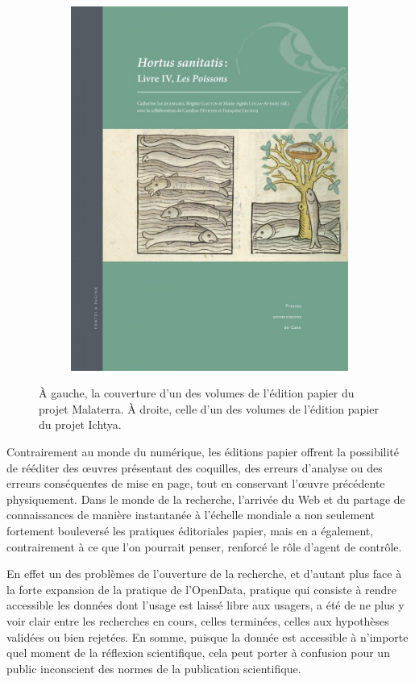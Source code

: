 \documentclass[a4paper,12pt,twoside]{book}
\begin{document}
\begin{figure}[H]
\begin{subfigure}[b]{0.3\linewidth}
      \includegraphics[width=\linewidth]{img/autre/depiscibus.jpg}
    \end{subfigure}
    \caption{À gauche, la couverture d'un des volumes de l'édition papier du projet Malaterra. À droite, celle d'un des volumes de l'édition papier du projet Ichtya.}
    \label{papier}
\end{figure}

Contrairement au monde du numérique, les éditions papier offrent la possibilité de rééditer des \oe{}uvres présentant des coquilles, des erreurs d'analyse ou des erreurs conséquentes de mise en page, tout en conservant l'\oe{}uvre précédente physiquement. Dans le monde de la recherche, l'arrivée du Web et du partage de connaissances de manière instantanée à l'échelle mondiale a non seulement fortement bouleversé les pratiques éditoriales papier, mais en a également, contrairement à ce que l'on pourrait penser, renforcé le rôle d'agent de contrôle.

En effet un des problèmes de l'ouverture de la recherche, et d'autant plus face à la forte expansion de la pratique de l'OpenData, pratique qui consiste à rendre accessible les données dont l'usage est laissé libre aux usagers, a été de ne plus y voir clair entre les recherches en cours, celles terminées, celles aux hypothèses validées ou bien rejetées. En somme, puisque la donnée est accessible à n'importe quel moment de la réflexion scientifique, cela peut porter à confusion pour un public inconscient des normes de la publication scientifique.
\end{document}
